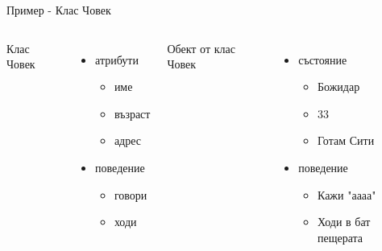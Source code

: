 \documentclass{beamer}
\begin{document}
\begin{frame}{Пример - Клас Човек}
  \begin{columns}
    Клас Човек
    \begin{itemize}
    \item атрибути \pause
      \begin{itemize}
      \item име
      \item възраст 
      \item адрес
      \end{itemize}
    \item поведение \pause
      \begin{itemize}
      \item говори
      \item ходи
      \end{itemize}
    \end{itemize} \pause

    Обект от клас Човек
    \begin{itemize}
    \item състояние \pause
      \begin{itemize}
      \item Божидар
      \item 33 
      \item Готам Сити
      \end{itemize}
    \item поведение \pause
      \begin{itemize}
      \item Кажи "аааа"
      \item Ходи в бат пещерата
      \end{itemize}
    \end{itemize}
  \end{columns}
\end{frame}
\end{document}
